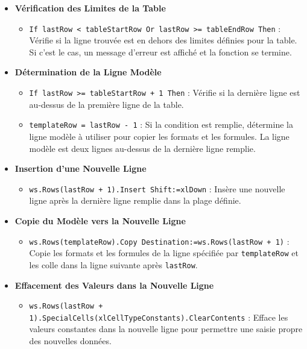 \documentclass[a4paper, oneside, 12pt, final]{extreport}
\begin{document}
\begin{itemize}
\item\textbf{Vérification des Limites de la Table}

\begin{itemize}
    \item \texttt{If lastRow < tableStartRow Or lastRow >= tableEndRow Then} : Vérifie si la ligne trouvée est en dehors des limites définies pour la table. Si c'est le cas, un message d'erreur est affiché et la fonction se termine.
\end{itemize}

\item\textbf{Détermination de la Ligne Modèle}

\begin{itemize}
    \item \texttt{If lastRow >= tableStartRow + 1 Then} : Vérifie si la dernière ligne est au-dessus de la première ligne de la table.
    \item \texttt{templateRow = lastRow - 1} : Si la condition est remplie, détermine la ligne modèle à utiliser pour copier les formats et les formules. La ligne modèle est deux lignes au-dessus de la dernière ligne remplie.
\end{itemize}

\item\textbf{Insertion d'une Nouvelle Ligne}

\begin{itemize}
    \item \texttt{ws.Rows(lastRow + 1).Insert Shift:=xlDown} : Insère une nouvelle ligne après la dernière ligne remplie dans la plage définie.
\end{itemize}

\item\textbf{Copie du Modèle vers la Nouvelle Ligne}

\begin{itemize}
    \item \texttt{ws.Rows(templateRow).Copy Destination:=ws.Rows(lastRow + 1)} : Copie les formats et les formules de la ligne spécifiée par \texttt{templateRow} et les colle dans la ligne suivante après \texttt{lastRow}.
\end{itemize}

\item\textbf{Effacement des Valeurs dans la Nouvelle Ligne}

\begin{itemize}
    \item \texttt{ws.Rows(lastRow + 1).SpecialCells(xlCellTypeConstants).ClearContents} : Efface les valeurs constantes dans la nouvelle ligne pour permettre une saisie propre des nouvelles données.
\end{itemize}


\end{itemize}
\end{document}
